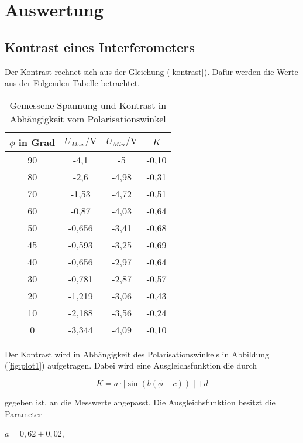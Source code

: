 \section{Auswertung}
\label{sec:Auswertung}

 \subsection{Kontrast eines Interferometers}
Der Kontrast rechnet sich aus der Gleichung (\ref{kontrast}). Dafür werden die Werte aus der Folgenden Tabelle betrachtet.

  \begin{table}
 \centering
 \begin{tabular}{c|c|c|c}

 $\phi$ in Grad 	&	$U_{Max}/ \si{\volt}$&	$U_{Min}/ \si{\volt}$	&	$K$	\\
\hline
90	&	-4,1	&	-5	&	-0,10	\\
80	&	-2,6	&	-4,98	&	-0,31	\\
70	&	-1,53	&	-4,72	&	-0,51	\\
60	&	-0,87	&	-4,03	&	-0,64	\\
50	&	-0,656	&	-3,41	&	-0,68	\\
45	&	-0,593	&	-3,25	&	-0,69	\\
40	&	-0,656	&	-2,97	&	-0,64	\\
30	&	-0,781	&	-2,87	&	-0,57	\\
20	&	-1,219	&	-3,06	&	-0,43	\\
10	&	-2,188	&	-3,56	&	-0,24	\\
0	&	-3,344	&	-4,09	&	-0,10	\\

 \end{tabular}
 \caption{Gemessene Spannung und Kontrast in Abhängigkeit vom Polarisationswinkel}
 \end{table}

 Der Kontrast wird in Abhängigkeit des Polarisationswinkels in Abbildung (\ref{fig:plot1}) aufgetragen.
 Dabei wird eine Ausgleichsfunktion die durch

  \begin{equation}
    K = a \cdot \mid \sin(b(\phi-c)) \mid +d
    \end{equation}

    gegeben ist, an die Messwerte angepasst. Die Ausgleichsfunktion besitzt die Parameter


\begin{center}
$a= 0,62 \pm 0,02 $,
\end{center}

